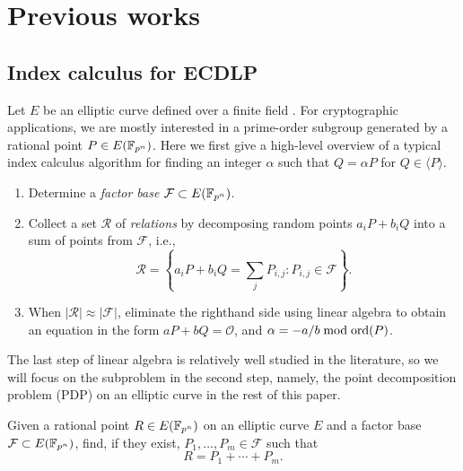 %
%

\section{Previous works}
\label{sec:previous-work}

\subsection{Index calculus for ECDLP}
%
\label{sec:index-calculus-ecdlp}
%
Let $E$ be an elliptic curve defined over a finite field .
%
For cryptographic applications, we are mostly interested in a
prime-order subgroup generated by a rational point $P\in E(\mathbb F_{p^n})$.
%
Here we first give a high-level overview of a typical index calculus
algorithm for finding an integer $\alpha$ such that $Q=\alpha P$ for
$Q\in\langle P\rangle$.
%
\begin{enumerate}
%
\item Determine a \emph{factor base} $\mathcal F\subset E(\mathbb F_{p^n})$.
%
\item Collect a set $\mathcal R$ of \emph{relations} by decomposing
  random points $a_iP+b_iQ$ into a sum of points from $\mathcal F$,
  i.e.,
  \[ \mathcal R=\left\{a_iP+b_iQ=\sum_jP_{i,j}:P_{i,j}\in\mathcal
      F\right\}. \]
%
\item When $|\mathcal R|\approx|\mathcal F|$, eliminate the righthand
  side using linear algebra to obtain an equation in the form
  $aP+bQ=\mathcal O$, and $\alpha=-a/b\bmod\operatorname{ord}(P)$.
%
\end{enumerate}
%
The last step of linear algebra is relatively well studied in the
literature, so we will focus on the subproblem in the second step,
namely, the point decomposition problem (PDP) on an elliptic curve in
the rest of this paper.
%
\begin{definition}
\label{def:pdp}
% 
Given a rational point $R\in E(\mathbb F_{p^n})$ on an elliptic curve $E$ and
a factor base $\mathcal F\subset E(\mathbb F_{p^n})$, find, if they exist,
$P_1,\dots,P_m\in\mathcal F$ such that \[ R=P_1 + \cdots + P_m. \]
%
\end{definition}

